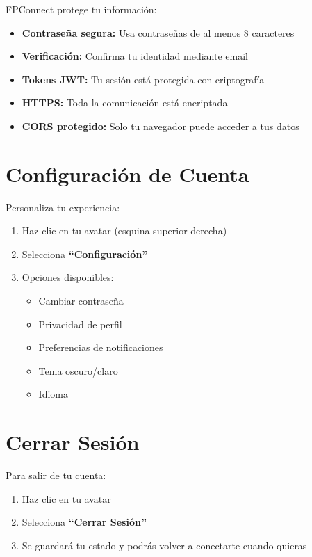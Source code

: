 \documentclass[a4paper]{report}
\begin{document}
FPConnect protege tu información:

\begin{itemize}
  \item \textbf{Contraseña segura:} Usa contraseñas de al menos 8 caracteres
  \item \textbf{Verificación:} Confirma tu identidad mediante email
  \item \textbf{Tokens JWT:} Tu sesión está protegida con criptografía
  \item \textbf{HTTPS:} Toda la comunicación está encriptada
  \item \textbf{CORS protegido:} Solo tu navegador puede acceder a tus datos
\end{itemize}

\section{Configuración de Cuenta}

Personaliza tu experiencia:

\begin{enumerate}
  \item Haz clic en tu avatar (esquina superior derecha)
  \item Selecciona \textbf{``Configuración''}
  \item Opciones disponibles:
  \begin{itemize}
    \item Cambiar contraseña
    \item Privacidad de perfil
    \item Preferencias de notificaciones
    \item Tema oscuro/claro
    \item Idioma
  \end{itemize}
\end{enumerate}

\section{Cerrar Sesión}

Para salir de tu cuenta:

\begin{enumerate}
  \item Haz clic en tu avatar
  \item Selecciona \textbf{``Cerrar Sesión''}
  \item Se guardará tu estado y podrás volver a conectarte cuando quieras
\end{enumerate}
\end{document}

